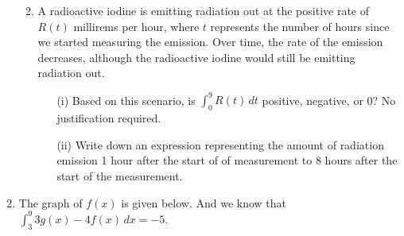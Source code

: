 \documentclass[11pt]{article}
\begin{document}
\begin{enumerate}
\begin{enumerate}
    \vfill

    \item A radioactive iodine is emitting radiation out at the positive rate of $R(t)$ millirems per hour, where $t$ represents the number of hours since we started measuring the emission. Over time, the rate of the emission decreases, although the radioactive iodine would still be emitting radiation out.

    \begin{enumerate}
        \item[(i)] Based on this scenario, is $\displaystyle \int_0^9 R(t)\, dt$ positive, negative, or 0? No justification required.

        \vfill

        \item[(ii)] Write down an expression representing the amount of radiation emission 1 hour after the start of of measurement to 8 hours after the start of the measurement.

        \vfill
    \end{enumerate}

    \vfill
\end{enumerate}



\newpage


\item The graph of $f(x)$ is given below. And we know that $\displaystyle\int_{3}^{9}3g(x)-4f(x)\,dx=-5$.

\begin{center}
    \end{center}


\end{enumerate}
\end{document}
